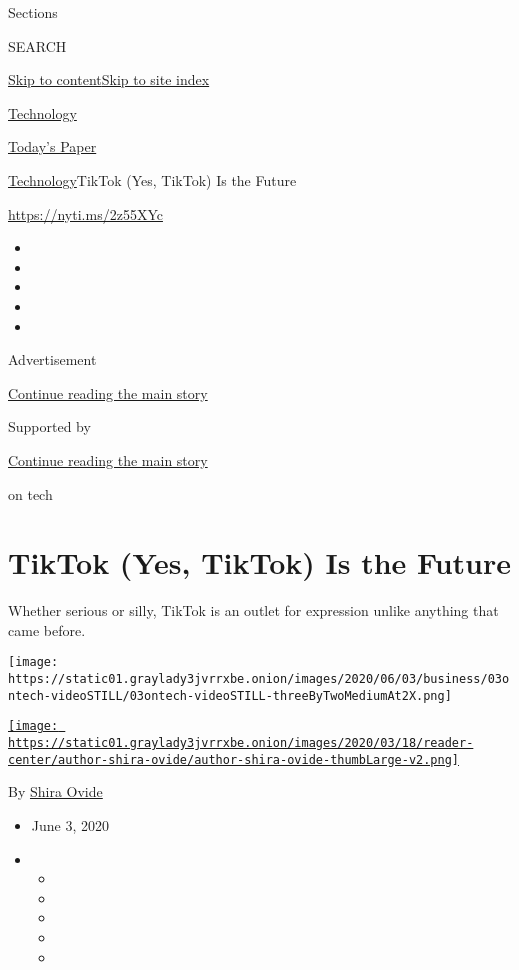 Sections

SEARCH

\protect\hyperlink{site-content}{Skip to
content}\protect\hyperlink{site-index}{Skip to site index}

\href{https://www.nytimes3xbfgragh.onion/section/technology}{Technology}

\href{https://myaccount.nytimes3xbfgragh.onion/auth/login?response_type=cookie\&client_id=vi}{}

\href{https://www.nytimes3xbfgragh.onion/section/todayspaper}{Today's
Paper}

\href{/section/technology}{Technology}\textbar{}TikTok (Yes, TikTok) Is
the Future

\url{https://nyti.ms/2z55XYc}

\begin{itemize}
\item
\item
\item
\item
\item
\end{itemize}

Advertisement

\protect\hyperlink{after-top}{Continue reading the main story}

Supported by

\protect\hyperlink{after-sponsor}{Continue reading the main story}

on tech

\hypertarget{tiktok-yes-tiktok-is-the-future}{%
\section{TikTok (Yes, TikTok) Is the
Future}\label{tiktok-yes-tiktok-is-the-future}}

Whether serious or silly, TikTok is an outlet for expression unlike
anything that came before.

\texttt{[image: https://static01.graylady3jvrrxbe.onion/images/2020/06/03/business/03ontech-videoSTILL/03ontech-videoSTILL-threeByTwoMediumAt2X.png]}

\href{https://www.nytimes3xbfgragh.onion/by/shira-ovide}{\texttt{[image: https://static01.graylady3jvrrxbe.onion/images/2020/03/18/reader-center/author-shira-ovide/author-shira-ovide-thumbLarge-v2.png]}}

By \href{https://www.nytimes3xbfgragh.onion/by/shira-ovide}{Shira Ovide}

\begin{itemize}
\item
  June 3, 2020
\item
  \begin{itemize}
  \item
  \item
  \item
  \item
  \item
  \end{itemize}
\end{itemize}

